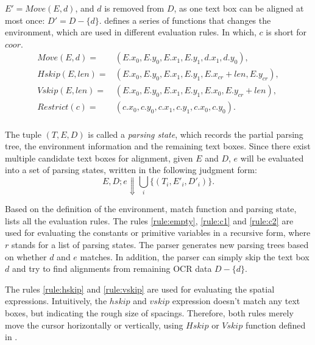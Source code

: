 $E' = Move(E, d)$, and $d$ is removed from $D$,
as one text box can be aligned at most once: $D' = D - \{d\}$.
 defines a series of functions
that changes the environment, which are used in different evaluation rules.
In which, $c$ is short for $coor$.
\begin{equation}
  \begin{aligned}
    Move(E, d) = & (E.x_0, E.y_0, E.x_1, E.y_1, d.x_1, d.y_0), \\
    Hskip(E, len) = & (E.x_0, E.y_0, E.x_1, E.y_1, E.x_{cr}+len, E.y_{cr}), \\
    Vskip(E, len) = & (E.x_0, E.y_0, E.x_1, E.y_1, E.x_0, E.y_{cr}+len), \\
    Restrict(c) = & (c.x_0, c.y_0, c.x_1, c.y_1, c.x_0, c.y_0). \\
  \end{aligned}
  \label{equ:semantic-operations}
\end{equation}

The tuple $(T, E, D)$ is called a \textit{parsing state},
which records the partial parsing tree,
the environment information and the remaining text boxes.
Since there exist multiple candidate text boxes for alignment,
given $E$ and $D$, $e$ will be evaluated into a set of parsing states,
written in the following judgment form:
\begin{equation}
  E,D;e \Downarrow \bigcup_{i} \{(T_i, E'_i, D'_i)\}.
\end{equation}




Based on the definition of the environment, match function and parsing state,
 lists all the evaluation rules.
The rules \ref{rule:empty}, \ref{rule:c1} and \ref{rule:c2} are used for
evaluating the constants or primitive variables in a recursive form,
where $r$ stands for a list of parsing states.
The parser generates new parsing trees based on whether $d$ and $e$ matches.
In addition, the parser can simply skip the text box $d$ and try to find
alignments from remaining OCR data $D-\{d\}$.

The rules \ref{rule:hskip} and \ref{rule:vskip}
are used for evaluating the spatial expressions.
Intuitively, the $hskip$ and $vskip$ expression doesn't match any text boxes,
but indicating the rough size of spacings.
Therefore, both rules merely move the cursor horizontally or vertically,
using $Hskip$ or $Vskip$ function defined in .

